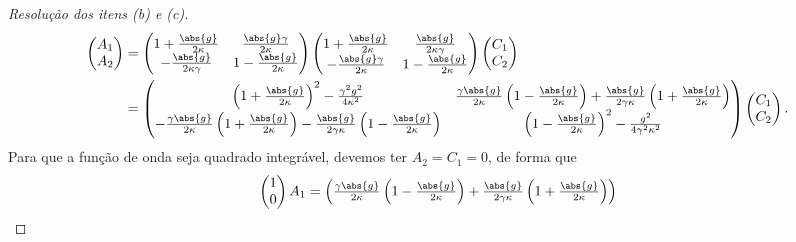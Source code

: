 \begin{proof}[Resolução dos itens (b) e (c)]
    \begin{align*}
        \begin{pmatrix}
            A_1\\
            A_2
        \end{pmatrix}
        &=
        \begin{pmatrix}
            1 + \frac{\abs{g}}{2 \kappa} & \frac{\abs{g} \gamma}{2 \kappa}\\
            - \frac{\abs{g}}{2 \kappa \gamma} & 1 - \frac{\abs{g}}{2 \kappa}
        \end{pmatrix}
        \begin{pmatrix}
            1 + \frac{\abs{g}}{2 \kappa} & \frac{\abs{g}}{2 \kappa \gamma}\\
            -\frac{\abs{g}\gamma}{2 \kappa} & 1 - \frac{\abs{g}}{2 \kappa}
        \end{pmatrix}
        \begin{pmatrix}
            C_1\\
            C_2
        \end{pmatrix}\\
        &=
        \begin{pmatrix}
            \left(1 + \frac{\abs{g}}{2 \kappa}\right)^2 - \frac{\gamma^2 g^2}{4 \kappa^2} & \frac{\gamma \abs{g}}{2 \kappa}\left(1 - \frac{\abs{g}}{2 \kappa}\right) + \frac{\abs{g}}{2 \gamma \kappa}\left(1 + \frac{\abs{g}}{2 \kappa}\right)\\
            -\frac{\gamma \abs{g}}{2 \kappa}\left(1 + \frac{\abs{g}}{2 \kappa}\right) - \frac{\abs{g}}{2 \gamma \kappa}\left(1 - \frac{\abs{g}}{2 \kappa}\right) & \left(1 - \frac{\abs{g}}{2 \kappa}\right)^2 - \frac{g^2}{4 \gamma^2 \kappa^2}
        \end{pmatrix}
        \begin{pmatrix}
            C_1\\
            C_2
        \end{pmatrix}.
    \end{align*}
    Para que a função de onda seja quadrado integrável, devemos ter \(A_2 = C_1 = 0\), de forma que
    \begin{equation*}
        \begin{pmatrix}
            1\\
            0
        \end{pmatrix} A_1 =
        \begin{pmatrix}
            \frac{\gamma \abs{g}}{2 \kappa}\left(1 - \frac{\abs{g}}{2 \kappa}\right) + \frac{\abs{g}}{2 \gamma \kappa}\left(1 + \frac{\abs{g}}{2 \kappa}\right)\\

\end{pmatrix}
\end{equation*}
\end{proof}
